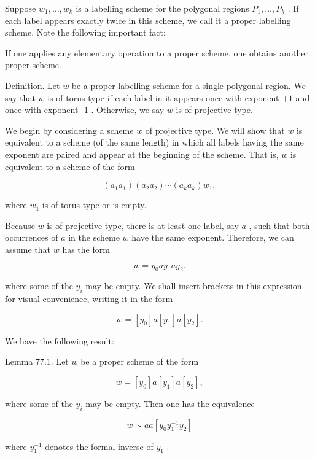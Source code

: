 Suppose \({w}_{1},\ldots ,{w}_{k}\) is a labelling scheme for the polygonal regions \({P}_{1},\ldots ,{P}_{k}\) . If each label appears exactly twice in this scheme, we call it a proper labelling scheme. Note the following important fact:

If one applies any elementary operation to a proper scheme, one obtains another proper scheme.

Definition. Let \(w\) be a proper labelling scheme for a single polygonal region. We say that \(w\) is of torus type if each label in it appears once with exponent \(+ 1\) and once with exponent -1 . Otherwise, we say \(w\) is of projective type.

We begin by considering a scheme \(w\) of projective type. We will show that \(w\) is equivalent to a scheme (of the same length) in which all labels having the same exponent are paired and appear at the beginning of the scheme. That is, \(w\) is equivalent to a scheme of the form

\[
\left( {{a}_{1}{a}_{1}}\right) \left( {{a}_{2}{a}_{2}}\right) \cdots \left( {{a}_{k}{a}_{k}}\right) {w}_{1},
\]

where \({w}_{1}\) is of torus type or is empty.

Because \(w\) is of projective type, there is at least one label, say \(a\) , such that both occurrences of \(a\) in the scheme \(w\) have the same exponent. Therefore, we can assume that \(w\) has the form

\[
w = {y}_{0}a{y}_{1}a{y}_{2}.
\]

where some of the \({y}_{i}\) may be empty. We shall insert brackets in this expression for visual convenience, writing it in the form

\[
w = \left\lbrack  {y}_{0}\right\rbrack  a\left\lbrack  {y}_{1}\right\rbrack  a\left\lbrack  {y}_{2}\right\rbrack  .
\]

We have the following result:

Lemma 77.1. Let \(w\) be a proper scheme of the form

\[
w = \left\lbrack  {y}_{0}\right\rbrack  a\left\lbrack  {y}_{1}\right\rbrack  a\left\lbrack  {y}_{2}\right\rbrack  ,
\]

where some of the \({y}_{i}\) may be empty. Then one has the equivalence

\[
w \sim  {aa}\left\lbrack  {{y}_{0}{y}_{1}^{-1}{y}_{2}}\right\rbrack
\]

where \({y}_{1}^{-1}\) denotes the formal inverse of \({y}_{1}\) .

